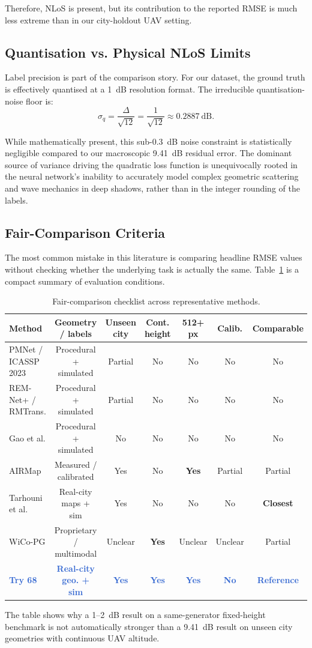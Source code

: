 \documentclass[11pt,a4paper]{article}
\newcommand{\better}[1]{\textcolor{good}{\textbf{#1}}}
\newcommand{\ours}[1]{\textcolor{highlight}{\textbf{#1}}}
\begin{document}
Therefore, NLoS is present, but its contribution to the reported RMSE is
much less extreme than in our city-holdout UAV setting.

\subsection{Quantisation vs. Physical NLoS Limits}

Label precision is part of the comparison story. For our dataset, the ground truth is effectively quantised at a 1~dB resolution format. The irreducible quantisation-noise floor is:
\[
    \sigma_q = \frac{\Delta}{\sqrt{12}} = \frac{1}{\sqrt{12}} \approx 0.2887~\mathrm{dB}.
\]

While mathematically present, this sub-0.3~dB noise constraint is statistically negligible compared to our macroscopic 9.41~dB residual error. The dominant source of variance driving the quadratic loss function is unequivocally rooted in the neural network's inability to accurately model complex geometric scattering and wave mechanics in deep shadows, rather than in the integer rounding of the labels.

\subsection{Fair-Comparison Criteria}

The most common mistake in this literature is comparing headline RMSE values
without checking whether the underlying task is actually the same. Table~\ref{tab:fairness} is a compact summary of evaluation conditions.

\begin{table}[h!]
\centering
\caption{Fair-comparison checklist across representative methods.}
\label{tab:fairness}
\footnotesize
\begin{tabularx}{\textwidth}{Xcccccc}
\toprule
\textbf{Method} & \textbf{Geometry / labels} & \textbf{Unseen city} & \textbf{Cont. height}
& \textbf{512+ px} & \textbf{Calib.} & \textbf{Comparable} \\
\midrule
PMNet / ICASSP 2023 & Procedural + simulated & Partial & No & No & No & No \\
REM-Net+ / RMTrans. & Procedural + simulated & Partial & No & No & No & No \\
Gao et al. & Procedural + simulated & No & No & No & No & No \\
AIRMap & Measured / calibrated & Yes & No & \better{Yes} & Partial & Partial \\
Tarhouni et al. & Real-city maps + sim & Yes & No & No & No & \better{Closest} \\
WiCo-PG & Proprietary / multimodal & Unclear & \better{Yes} & Unclear & Unclear & Partial \\
\ours{Try 68} & \ours{Real-city geo. + sim} & \ours{Yes} & \ours{Yes} & \ours{Yes} & \ours{No} & \ours{Reference} \\
\bottomrule
\end{tabularx}
\end{table}
\normalsize
The table shows why a 1--2~dB result on a same-generator fixed-height benchmark
is not automatically stronger than a 9.41~dB result on unseen city geometries with
continuous UAV altitude. 
\end{document}
